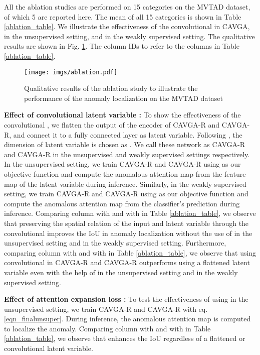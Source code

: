 \documentclass[runningheads]{llncs}
\begin{document}
All the ablation studies are performed on 15 categories on the MVTAD dataset, of which 5 are reported here. The mean of all 15 categories is shown in Table \ref{ablation_table}. We illustrate the effectiveness of the convolutional  in CAVGA,  in the unsupervised setting, and  in the weakly supervised setting. The qualitative results are shown in Fig. \ref{fig_ablation}. The column IDs to refer to the columns in Table \ref{ablation_table}.
\begin{figure}
\centering
\texttt{[image: imgs/ablation.pdf]}
\caption{Qualitative results of the ablation study to illustrate the performance of the anomaly localization on the MVTAD dataset}
\label{fig_ablation}

\end{figure}

\textbf{Effect of convolutional latent variable :} To show the effectiveness of the convolutional , we flatten the output of the encoder of CAVGA-R and CAVGA-R, and connect it to a fully connected layer as latent variable. Following \cite{bergmann2018improving}, the dimension of latent variable is chosen as . We call these network as CAVGA-R and CAVGA-R in the unsupervised and weakly supervised settings respectively. In the unsupervised setting, we train CAVGA-R and CAVGA-R  using  as our objective function and compute the anomalous attention map from the feature map of the latent variable during inference. Similarly, in the weakly supervised setting, we train CAVGA-R and CAVGA-R  using  as our objective function and compute the anomalous attention map from the classifier's prediction during inference. Comparing column  with  and  with  in Table \ref{ablation_table}, we observe that preserving the spatial relation of the input and latent variable through the convolutional  improves the IoU in anomaly localization without the use of  in the unsupervised setting and  in the weakly supervised setting. Furthermore, comparing column  with  and  with  in Table \ref{ablation_table}, we observe that using convolutional  in CAVGA-R and CAVGA-R outperforms using a flattened latent variable even with the help of  in the unsupervised setting and  in the weakly supervised setting.

\textbf{Effect of attention expansion loss :} To test the effectiveness of using  in the unsupervised setting, we train CAVGA-R and CAVGA-R with eq. \ref{eqn_finalunsuper}. During inference, the anomalous attention map is computed to localize the anomaly. Comparing column  with  and  with  in Table \ref{ablation_table}, we observe that  enhances the IoU regardless of a flattened or convolutional latent variable.
\end{document}

